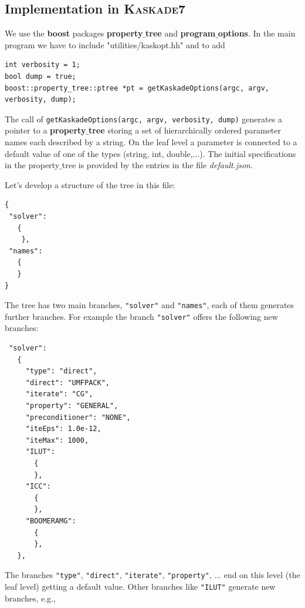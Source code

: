 \documentclass[11pt]{article}
\newcommand{\K}{\textsc{Kaskade7 }}
\begin{document}
\subsection{Implementation in \K}

We use the {\bf boost} packages {\bf property$\_$tree} and {\bf program$\_$options}.
In the main program we have to include "utilities/kaskopt.hh"
and to add

\begin{lstlisting}
int verbosity = 1;
bool dump = true;
boost::property_tree::ptree *pt = getKaskadeOptions(argc, argv, verbosity, dump);
\end{lstlisting}

\noindent The call of {\tt getKaskadeOptions(argc, argv, verbosity, dump)} generates a pointer to a 
{\bf property$\_$tree} storing a set of hierarchically ordered parameter names each described by a string.
On the leaf level a  parameter is connected to a default value of one of the types (string, int, double,...).
The initial specifications in the { property$\_$tree} is provided by the  entries in the file {\em default.json}.

Let's develop a structure of the tree in this file:

\begin{scriptsize}
\begin{verbatim}
{
 "solver":
   {
    },
 "names":
   {
   }
}
\end{verbatim}
\end{scriptsize}
The tree has two main branches, {\tt "solver"} and {\tt "names"}, each of them
generates further branches. For example the branch {\tt "solver"} offers the following
new branches:

\begin{scriptsize}
\begin{verbatim}
 "solver":
   {
     "type": "direct",
     "direct": "UMFPACK",
     "iterate": "CG",
     "property": "GENERAL",
     "preconditioner": "NONE",
     "iteEps": 1.0e-12,
     "iteMax": 1000,
     "ILUT":
       {
       },
     "ICC":
       {
       },
     "BOOMERAMG":
       {
       },
   },
\end{verbatim}
\end{scriptsize}

The branches {\tt "type"}, {\tt "direct"}, {\tt "iterate"}, {\tt "property"}, ... end on this
level (the leaf level) getting a default value. Other branches like {\tt "ILUT"} generate new branches, e.g.,
\end{document}
